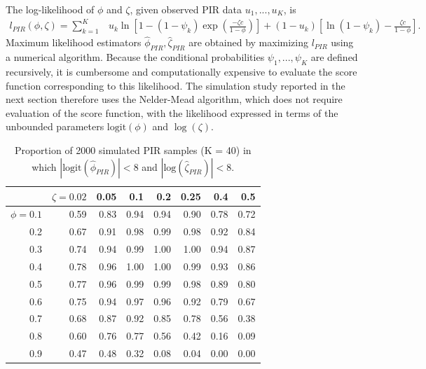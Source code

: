 \documentclass[man, noextraspace, floatsintext]{apa6}\usepackage[]{graphicx}\usepackage[]{color}
\newcommand{\logit}{\text{logit}}
\begin{document}
The log-likelihood of $\phi$ and $\zeta$, given observed PIR data $u_1,...,u_K$, is
\begin{align}
\label{eq:PIR_loglik}
l_{PIR}\left(\phi,\zeta\right) = \sum_{k=1}^K & u_k \ln\left[1 - (1 - \psi_k)\exp\left( \frac{-\zeta c}{1 - \phi}\right)\right]  + (1 - u_k)\left[\ln\left(1 - \psi_k \right) - \frac{\zeta c}{1 - \phi}\right].
\end{align}
Maximum likelihood estimators $\hat\phi_{PIR}, \hat\zeta_{PIR}$ are obtained by maximizing $l_{PIR}$ using a numerical algorithm. 
Because the conditional probabilities $\psi_1,...,\psi_K$ are defined recursively, it is cumbersome and computationally expensive to evaluate the score function corresponding to this likelihood. 
The simulation study reported in the next section therefore uses the Nelder-Mead algorithm, which does not require evaluation of the score function, with the likelihood expressed in terms of the unbounded parameters $\logit(\phi)$ and $\log(\zeta)$.



\begin{table}[b]
\centering
\caption{Proportion of 2000 simulated PIR samples (K = 40) in which  $|\text{logit}(\hat\phi_{PIR})| < 8$ and $|\text{log}(\hat\zeta_{PIR})| < 8$.} 
\label{tab:PIR_ests_valid}
\begin{tabular}{rrrrrrrr}
  \hline
 & $\zeta = 0.02$ & 0.05 & 0.1 & 0.2 & 0.25 & 0.4 & 0.5 \\ 
  \hline
$\phi = 0.1$ & 0.59 & 0.83 & 0.94 & 0.94 & 0.90 & 0.78 & 0.72 \\ 
  0.2 & 0.67 & 0.91 & 0.98 & 0.99 & 0.98 & 0.92 & 0.84 \\ 
  0.3 & 0.74 & 0.94 & 0.99 & 1.00 & 1.00 & 0.94 & 0.87 \\ 
  0.4 & 0.78 & 0.96 & 1.00 & 1.00 & 0.99 & 0.93 & 0.86 \\ 
  0.5 & 0.77 & 0.96 & 0.99 & 0.99 & 0.98 & 0.89 & 0.80 \\ 
  0.6 & 0.75 & 0.94 & 0.97 & 0.96 & 0.92 & 0.79 & 0.67 \\ 
  0.7 & 0.68 & 0.87 & 0.92 & 0.85 & 0.78 & 0.56 & 0.38 \\ 
  0.8 & 0.60 & 0.76 & 0.77 & 0.56 & 0.42 & 0.16 & 0.09 \\ 
  0.9 & 0.47 & 0.48 & 0.32 & 0.08 & 0.04 & 0.00 & 0.00 \\ 
   \hline
\end{tabular}
\end{table}
\end{document}
